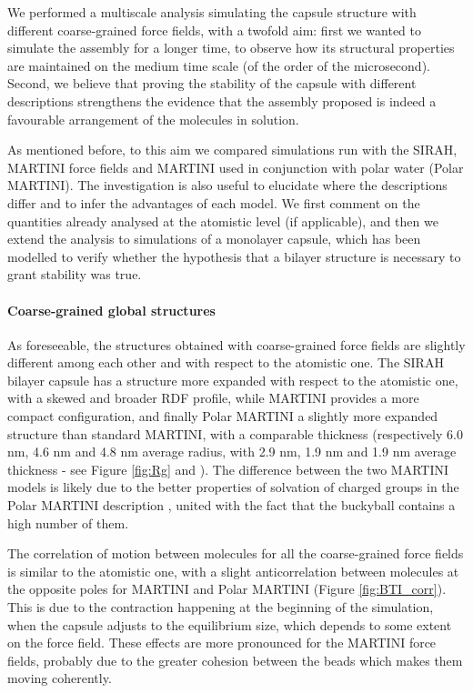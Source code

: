 We performed a multiscale analysis simulating the capsule structure with different coarse-grained force fields, with a twofold aim: first we wanted to simulate the assembly for a longer time, to observe how its structural properties are maintained on the medium time scale (of the order of the microsecond). Second, we believe that proving the stability of the capsule with different descriptions strengthens the evidence that the assembly proposed is indeed a favourable arrangement of the molecules in solution.

As mentioned before, to this aim we compared simulations run with the SIRAH, MARTINI force fields and MARTINI used in conjunction with polar water (Polar MARTINI). The investigation is also useful to elucidate where the descriptions differ and to infer the advantages of each model.
%
We first comment on the quantities already analysed at the atomistic level (if applicable), and then we extend the analysis to simulations of a monolayer capsule, which has been modelled to verify whether the hypothesis that a bilayer structure is necessary to grant stability was true.

\paragraph{Coarse-grained global structures}
As foreseeable, the structures obtained with coarse-grained force fields are slightly different among each other and with respect to the atomistic one.
%
The SIRAH bilayer capsule has a structure more expanded with respect to the atomistic one, with a skewed and broader RDF profile, while MARTINI provides a more compact configuration, and finally Polar MARTINI a slightly more expanded structure than standard MARTINI, with a comparable thickness (respectively 6.0 nm, 4.6 nm and 4.8 nm average radius, with 2.9 nm, 1.9 nm and 1.9 nm average thickness - see Figure \ref{fig:Rg} and ).
%
The difference between the two MARTINI models is likely due to the better properties of solvation of charged groups in the Polar MARTINI description \citep{Yesylevskyy2010}, united with the fact that the buckyball contains a high number of them.

The correlation of motion between molecules for all the coarse-grained force fields is similar to the atomistic one, with a slight anticorrelation between molecules at the opposite poles for MARTINI and Polar MARTINI (Figure \ref{fig:BTI_corr}). This is due to the contraction happening at the beginning of the simulation, when the capsule adjusts to the equilibrium size, which depends to some extent on the force field.
%
These effects are more pronounced for the MARTINI force fields, probably due to the greater cohesion between the beads which makes them moving coherently.

